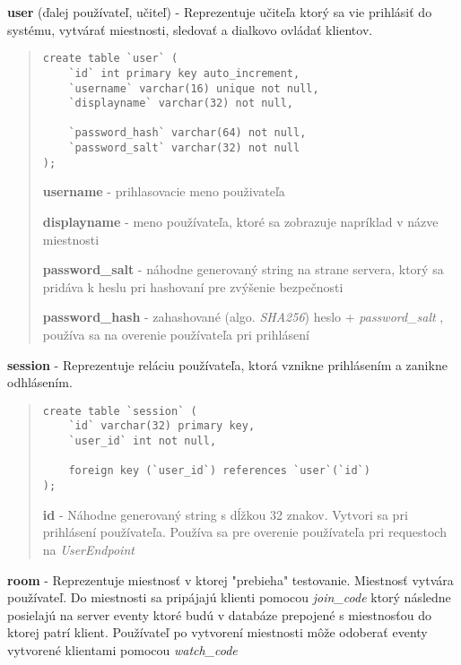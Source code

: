 \documentclass{article}
\newcommand{\filedesc}[1]{\vspace{0.3cm} \noindent \textbf{#1}}
\begin{document}
\filedesc{user} (ďalej používateľ, učiteľ) - Reprezentuje učiteľa ktorý sa vie prihlásiť do systému, vytvárať miestnosti, sledovať a dialkovo ovládať klientov.
\begin{quote}

\begin{verbatim}
create table `user` (
    `id` int primary key auto_increment,
    `username` varchar(16) unique not null,
    `displayname` varchar(32) not null,

    `password_hash` varchar(64) not null,
    `password_salt` varchar(32) not null
);
\end{verbatim}

\filedesc{username} - prihlasovacie meno použivateľa

\filedesc{displayname} - meno používateľa, ktoré sa zobrazuje napríklad v názve miestnosti

\filedesc{password{\_}salt} - náhodne generovaný string na strane servera, ktorý sa pridáva k heslu pri hashovaní pre zvýšenie bezpečnosti

\filedesc{password{\_}hash} - zahashované (algo. \emph{SHA256}) heslo + \emph{password{\_}salt} , používa sa na overenie používateľa pri prihlásení

\end{quote}

\filedesc{session} - Reprezentuje reláciu používateľa, ktorá vznikne prihlásením a zanikne odhlásením.

\begin{quote}

\begin{verbatim}
create table `session` (
    `id` varchar(32) primary key,
    `user_id` int not null,

    foreign key (`user_id`) references `user`(`id`)
);
\end{verbatim}

\filedesc{id} - Náhodne generovaný string s dĺžkou 32 znakov. Vytvori sa pri prihlásení používateľa. Používa sa pre overenie používateľa pri requestoch na \emph{UserEndpoint}

\end{quote}

\filedesc{room} - Reprezentuje miestnosť v ktorej "prebieha" testovanie. Miestnosť vytvára používateľ. Do miestnosti sa pripájajú klienti pomocou \emph{join{\_}code} ktorý následne posielajú na server eventy ktoré budú v databáze prepojené s miestnosťou do ktorej patrí klient. Používateľ po vytvorení miestnosti môže odoberať eventy vytvorené klientami pomocou \emph{watch{\_}code}
\end{document}
